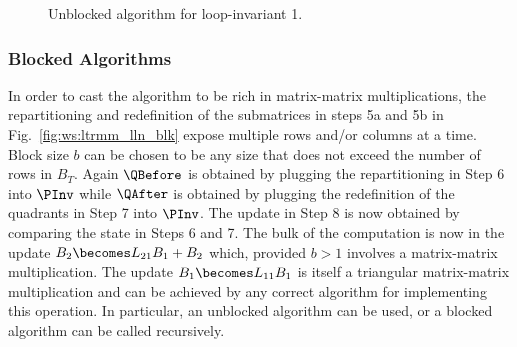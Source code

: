 
\begin{figure}[htbp]
\FlaAlgorithm
\caption{Unblocked algorithm for loop-invariant 1.}
\label{fig:alg:ltrmm_lln}
\end{figure}

\subsubsection{Blocked Algorithms}

In order to cast the algorithm to be rich in matrix-matrix
multiplications, the repartitioning and redefinition of the
submatrices in steps 5a and 5b in Fig.~\ref{fig:ws:ltrmm_lln_blk}
expose multiple rows and/or columns at a time.  Block size $ b $ can
be chosen to be any size that does not exceed the number of rows in $
B_T $.  Again $ \QBefore $ is obtained by plugging the repartitioning
in Step 6 into $ \PInv $ while $ \QAfter $ is obtained by plugging the
redefinition of the quadrants in Step 7 into $ \PInv $.  The update in
Step 8 is now obtained by comparing the state in Steps 6 and 7.  The
bulk of the computation is now in the update $ B_2 \becomes L_{21} B_1
+ B_2 $ which, provided $ b > 1 $ involves a matrix-matrix
multiplication.  The update $ B_1 \becomes L_{11} B_1 $ is itself a
triangular matrix-matrix multiplication and can be achieved by any
correct algorithm for implementing this operation.  In particular, an
unblocked algorithm can be used, or a blocked algorithm can be called
recursively.


\renewcommand{\blocksize}{ b }
%

\renewcommand{\repartitionings}{
$ 
\FlaTwoByOne{ B_T }{ B_B } 
\rightarrow
\FlaThreeByOneT{ B_0 }{ B_1 }{ B_2 },
\FlaTwoByOne{ \hat{B}_T }{ \hat{B}_B } 
\rightarrow
\FlaThreeByOneT{ \hat{B}_0 }{ \hat{B}_1 }{ \hat{B}_2 },
$ \\
and
$ \FlaTwoByTwo{ L_{TL} }{ 0 }
            { L_{BL} }{ L_{BR} }
\rightarrow
\FlaThreeByThreeTL{ L_{00} }{ 0 }{ 0 }
                { L_{10} }{ L_{11} }{ 0 }
                { L_{20} }{ L_{21} }{ L_{22} }
$
}
%
\renewcommand{\repartitionsizes}{
$ B_1 $ and $ \hat{B}_1 $ have $ b $ rows
and $ L_{11} $ is $ b \times b $
}

\renewcommand{\moveboundaries}{%
$ 
\FlaTwoByOne{ B_T }{ B_B } 
\leftarrow
\FlaThreeByOneB{ B_0 }{ B_1 }{ B_2 },
\FlaTwoByOne{ \hat{B}_T }{ \hat{B}_B } 
\leftarrow
\FlaThreeByOneB{ \hat{B}_0 }{ \hat{B}_1 }{ \hat{B}_2 },
$ \\
and
$ \FlaTwoByTwo{ L_{TL} }{ 0 }
            { L_{BL} }{ L_{BR} }
\leftarrow
\FlaThreeByThreeBR{ L_{00} }{ 0 }{ 0 }
                { L_{10} }{ L_{11} }{ 0 }
                { L_{20} }{ L_{21} }{ L_{22} }
$
}

